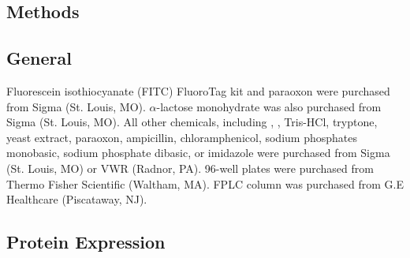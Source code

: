 \begin{refsection}
\section{Methods}

\subsection{General}

Fluorescein isothiocyanate (FITC) FluoroTag kit and paraoxon were purchased
from Sigma (St. Louis, MO).  $\alpha$-lactose monohydrate was also purchased
from Sigma (St. Louis, MO). All other chemicals, including ,
, Tris-HCl, tryptone, yeast extract, paraoxon, ampicillin,
chloramphenicol, sodium phosphates monobasic, sodium phosphate dibasic, or
imidazole were purchased from Sigma (St. Louis, MO) or VWR (Radnor, PA).
96-well plates were purchased from Thermo Fisher Scientific (Waltham, MA). FPLC
column was purchased from G.E Healthcare (Piscataway, NJ). 

\subsection{Protein Expression}
\label{sec:pte-chap3}


\end{refsection}
